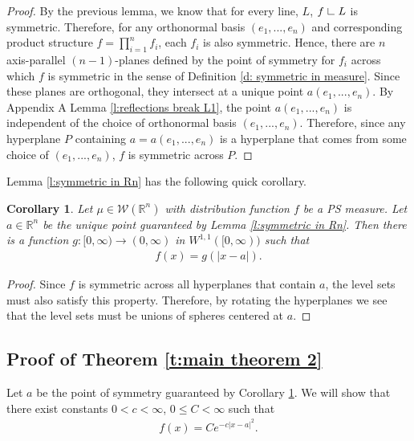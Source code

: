 \documentclass[12pt]{amsart}
\numberwithin{equation}{section}
\theoremstyle{plain}
\newtheorem{corollary}[theorem]{Corollary}
\theoremstyle{definition}
\newcommand{\res}{\hbox{ {\vrule height .22cm}{\leaders\hrule\hskip.2cm} }}
\begin{document}
\begin{proof}
    By the previous lemma, we know that for every line, $L$, $f\res L$ is symmetric.  Therefore, for any orthonormal basis $(e_1, ..., e_n)$ and corresponding product structure $f = \prod_{i=1}^n f_i$, each $f_i$ is also symmetric.  Hence, there are $n$ axis-parallel $(n-1)$-planes defined by the point of symmetry for $f_i$ across which $f$ is symmetric in the sense of Definition \ref{d: symmetric in measure}.  Since these planes are orthogonal, they intersect at a unique point $a(e_1, ..., e_n)$. By Appendix A Lemma \ref{l:reflections break L1}, the point $a(e_1, ..., e_n)$ is independent of the choice of orthonormal basis $(e_1, ..., e_n)$.  Therefore, since any hyperplane $P$ containing $a = a(e_1, ..., e_n)$ is a hyperplane that comes from some choice of $(e_1, ..., e_n)$, $f$ is symmetric across $P$.
\end{proof}

Lemma \ref{l:symmetric in Rn} has the following quick corollary.

\begin{corollary}\label{l:radial}
Let $\mu \in \mathscr{W}(\mathbb{R}^n)$ with distribution function $f$ be a PS measure. Let $a \in \mathbb{R}^n$ be the unique point guaranteed by Lemma \ref{l:symmetric in Rn}.  Then there is a function $g:[0, \infty) \rightarrow (0, \infty)$ in $W^{1,1}([0, \infty))$ such that 
\begin{align}
    f(x) = g(|x-a|).
\end{align}
\end{corollary}

\begin{proof}
    Since $f$ is symmetric across all hyperplanes that contain $a$, the level sets must also satisfy this property.  Therefore, by rotating the hyperplanes we see that the level sets must be unions of spheres centered at $a$.   
\end{proof}

\subsection{Proof of Theorem \ref{t:main theorem 2}}\label{l:f is gaussian}
Let $a$ be the point of symmetry guaranteed by Corollary \ref{l:radial}.  We will show that there exist constants $0< c< \infty$, $0 \le C < \infty$ such that
\begin{align*}
    f(x) = Ce^{-c|x-a|^2}.
\end{align*}
\end{document}
